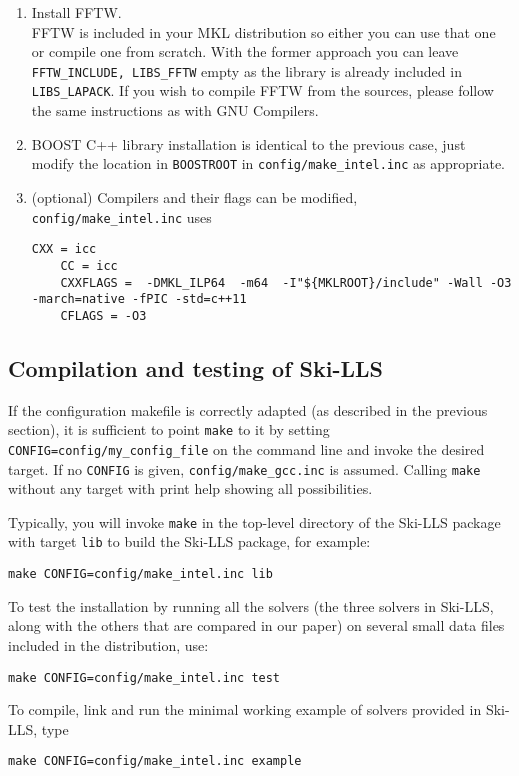 \documentclass[english,11pt]{article}
\begin{document}
\begin{enumerate}
    \item Install FFTW.\\
    FFTW is included in your MKL distribution so either you can use that one or compile one from scratch. With the former approach you can leave {\tt FFTW_INCLUDE, LIBS_FFTW} empty as the library is already included in {\tt LIBS_LAPACK}. If you wish to compile FFTW from the sources, please follow the same instructions as with GNU Compilers.
    
    \item BOOST C++ library installation is identical to the previous case, just modify the location in {\tt BOOSTROOT} in {\tt config/make_intel.inc} as appropriate.
    
    \item (optional) Compilers and their flags can be modified, {\tt config/make_intel.inc} uses
    \begin{lstlisting}[breaklines=true, showstringspaces=false]
    CXX = icc
    CC = icc
    CXXFLAGS =  -DMKL_ILP64  -m64  -I"${MKLROOT}/include" -Wall -O3 -march=native -fPIC -std=c++11
    CFLAGS = -O3
    \end{lstlisting}
\end{enumerate}

\subsection{Compilation and testing of Ski-LLS}

If the configuration makefile is correctly adapted (as described in the previous section), it is sufficient to point {\tt make} to it by setting {\tt CONFIG=config/my_config_file} on the command line and invoke the desired target. If no {\tt CONFIG} is given, {\tt config/make_gcc.inc} is assumed. Calling {\tt make} without any target with print help showing all possibilities.

Typically, you will invoke {\tt make} in the top-level directory of the Ski-LLS package with target {\tt lib} to build the Ski-LLS package, for example:
\begin{lstlisting}[breaklines=true, showstringspaces=false]
make CONFIG=config/make_intel.inc lib
\end{lstlisting}
To test the installation by running all the solvers (the three solvers in Ski-LLS, along with the others that are compared in our paper) on several small data files included in the distribution, use:
\begin{lstlisting}[breaklines=true, showstringspaces=false]
make CONFIG=config/make_intel.inc test
\end{lstlisting}
To compile, link and run the minimal working example of solvers provided in Ski-LLS, type
\begin{lstlisting}[breaklines=true, showstringspaces=false]
make CONFIG=config/make_intel.inc example
\end{lstlisting}
\end{document}

